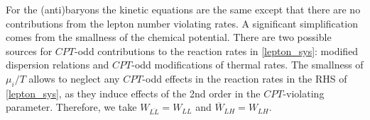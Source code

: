 \documentclass[12pt]{revtex4}
\newcommand{\ov}{\overline}
\begin{document}
	For the (anti)baryons the kinetic equations are the same except
	that there are no contributions from the lepton number violating
	rates. 
A significant simplification comes from the smallness of the chemical potential.
	There are two possible sources for $CPT$-odd contributions 
	to the reaction rates in \eqref{lepton_sys}: modified dispersion relations and 
	$CPT$-odd modifications of thermal rates.  The smallness of $\mu_i/T$ allows to neglect 
	any $CPT$-odd effects in the reaction rates in the RHS of 
	\eqref{lepton_sys}, as
	they induce effects of the 2nd order in the $CPT$-violating parameter. Therefore, 
we take
	$ W_{\ov{LL}} = W_{LL} $ and
	$ \ov{W}_{L{H}} = W_{L{H}} $.
\end{document}
